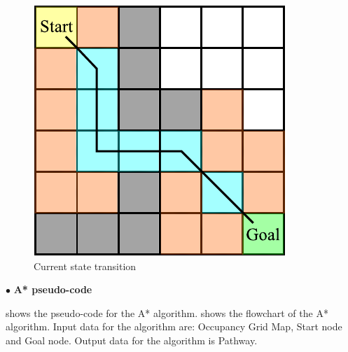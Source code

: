 \begin{figure}[ht]
	\centering
	\includegraphics[scale=0.85]{images/imagess/6pp-transistion.pdf}
	\caption{Current state transition}
	\label{fig:Current state transition}
\end{figure}


$\bullet$ \textbf{A* pseudo-code} \par

\textbf{\tableautorefname{ \ref{Table: A* Pseudo-code}}} shows the pseudo-code for the A* algorithm. \textbf{\figureautorefname{ \ref{fig:A* Flowchart}}} shows the flowchart of the A* algorithm. Input data for the algorithm are: Occupancy Grid Map, Start node and Goal node. Output data for the algorithm is Pathway.







